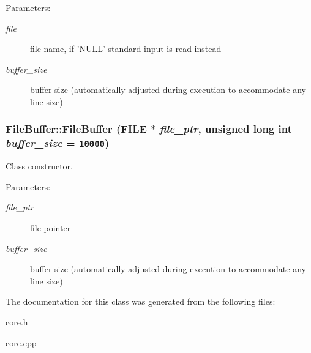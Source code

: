 \begin{Desc}
\item[Parameters:]
\begin{description}
\item[{\em file}]file name, if 'NULL' standard input is read instead \item[{\em buffer\_\-size}]buffer size (automatically adjusted during execution to accommodate any line size) \end{description}
\end{Desc}
\hypertarget{classFileBuffer_490eb6dcf60d7c804ad677035e38db40}{
\subsubsection[FileBuffer]{\setlength{\rightskip}{0pt plus 5cm}FileBuffer::FileBuffer (FILE $\ast$ {\em file\_\-ptr}, \/  unsigned long int {\em buffer\_\-size} = {\tt 10000})}}
\label{classFileBuffer_490eb6dcf60d7c804ad677035e38db40}


Class constructor. 

\begin{Desc}
\item[Parameters:]
\begin{description}
\item[{\em file\_\-ptr}]file pointer \item[{\em buffer\_\-size}]buffer size (automatically adjusted during execution to accommodate any line size) \end{description}
\end{Desc}


The documentation for this class was generated from the following files:\begin{CompactItemize}
\item 
core.h\item 
core.cpp\end{CompactItemize}
